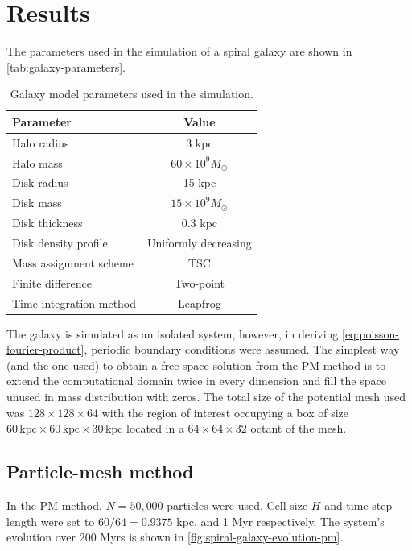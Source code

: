 \section{Results}
The parameters used in the simulation of a spiral galaxy are shown in \autoref{tab:galaxy-parameters}.
\begin{table}[htp]
    \centering
    \begin{tabular}{|l|c|}
        \hline
        \textbf{Parameter}      & \textbf{Value}           \\
        \hline
        Halo radius             & 3 kpc                    \\
        Halo mass               & $60 \times 10^9 M_\odot$ \\
        Disk radius             & 15 kpc                   \\
        Disk mass               & $15 \times 10^9 M_\odot$ \\
        Disk thickness          & 0.3 kpc                  \\
        Disk density profile    & Uniformly decreasing     \\
        Mass assignment scheme  & TSC                      \\
        Finite difference       & Two-point                \\
        Time integration method & Leapfrog                 \\
        \hline
    \end{tabular}
    \caption{Galaxy model parameters used in the simulation.}
    \label{tab:galaxy-parameters}
\end{table}
The galaxy is simulated as an isolated system, however, in deriving \autoref{eq:poisson-fourier-product}, periodic boundary conditions were assumed.
The simplest way (and the one used) to obtain a free-space solution from the PM method is to extend the computational domain twice in every dimension and fill the space unused in mass distribution with zeros.
The total size of the potential mesh used was $128 \times 128 \times 64$ with the region of interest occupying a box of size $60\, \text{kpc}\times 60\, \text{kpc}\times 30\, \text{kpc}$ located in a $64 \times 64 \times 32$ octant of the mesh.

\subsection{Particle-mesh method}
In the PM method, $N=50,000$ particles were used.
Cell size $H$ and time-step length were set to $60/64=0.9375$ kpc, and 1 Myr respectively.
The system's evolution over 200 Myrs is shown in \autoref{fig:spiral-galaxy-evolution-pm}.

